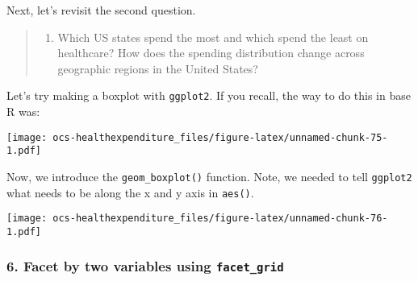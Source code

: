 \documentclass[]{article}
\newenvironment{Shaded}{\begin{snugshade}}{\end{snugshade}}
\newcommand{\DataTypeTok}[1]{\textcolor[rgb]{0.13,0.29,0.53}{#1}}
\newcommand{\KeywordTok}[1]{\textcolor[rgb]{0.13,0.29,0.53}{\textbf{#1}}}
\newcommand{\NormalTok}[1]{#1}
\newcommand{\OperatorTok}[1]{\textcolor[rgb]{0.81,0.36,0.00}{\textbf{#1}}}
\newcommand{\StringTok}[1]{\textcolor[rgb]{0.31,0.60,0.02}{#1}}
\providecommand{\tightlist}{%
  \setlength{\itemsep}{0pt}\setlength{\parskip}{0pt}}
\begin{document}
Next, let's revisit the second question.

\begin{quote}
\begin{enumerate}
\def\labelenumi{\arabic{enumi}.}
\setcounter{enumi}{1}
\tightlist
\item
  Which US states spend the most and which spend the least on
  healthcare? How does the spending distribution change across
  geographic regions in the United States?
\end{enumerate}
\end{quote}

Let's try making a boxplot with \texttt{ggplot2}. If you recall, the way
to do this in base R was:

\begin{Shaded}
\end{Shaded}

\texttt{[image: ocs-healthexpenditure\_files/figure-latex/unnamed-chunk-75-1.pdf]}

Now, we introduce the \texttt{geom\_boxplot()} function. Note, we needed
to tell \texttt{ggplot2} what needs to be along the x and y axis in
\texttt{aes()}.

\begin{Shaded}
\end{Shaded}

\texttt{[image: ocs-healthexpenditure\_files/figure-latex/unnamed-chunk-76-1.pdf]}

\hypertarget{facet-by-two-variables-using-facet_grid}{%
\subsubsection{\texorpdfstring{6. Facet by two variables using
\texttt{facet\_grid}}{6. Facet by two variables using facet\_grid}}\label{facet-by-two-variables-using-facet_grid}}
\end{document}
